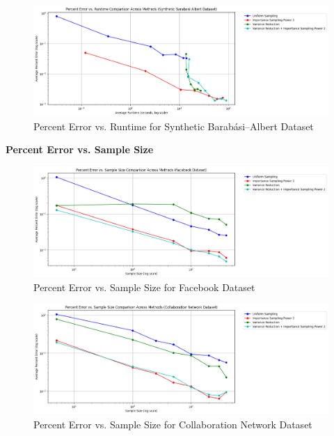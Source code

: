 \documentclass[11pt]{article}
\begin{document}
\begin{figure}[H]
\centering
\includegraphics[width=0.9\linewidth]{plots/comparisons/ba/limited_method_percent_error_vs_runtime_comparison.png}
\caption{Percent Error vs. Runtime for Synthetic Barabási–Albert Dataset}
\label{fig:ba_runtime}
\end{figure}

\textbf{Percent Error vs. Sample Size}

\begin{figure}[H]
\centering
\includegraphics[width=0.9\linewidth]{plots/comparisons/fb/limited_method_percent_error_vs_sample_size_comparison.png}
\caption{Percent Error vs. Sample Size for Facebook Dataset}
\label{fig:fb_sample_size}
\end{figure}

\begin{figure}[H]
\centering
\includegraphics[width=0.9\linewidth]{plots/comparisons/GrQc/limited_method_percent_error_vs_sample_size_comparison.png}
\caption{Percent Error vs. Sample Size for Collaboration Network Dataset}
\label{fig:grqc_sample_size}
\end{figure}
\end{document}
